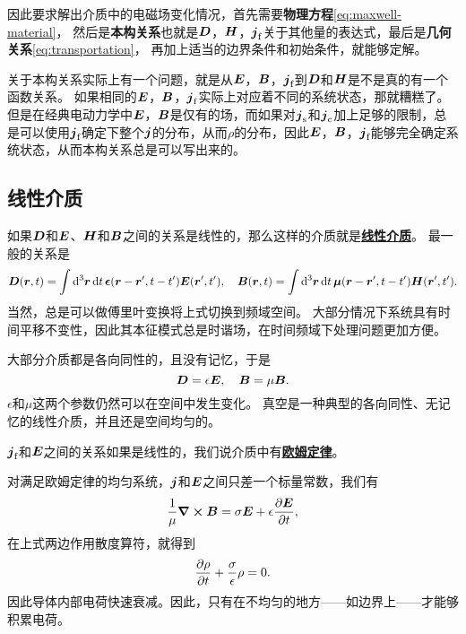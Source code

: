\documentclass[UTF8, a4paper]{ctexart}
\renewcommand{\emph}[1]{\textbf{#1}}
\newcommand*{\concept}[1]{\underline{\textbf{#1}}}
\begin{document}
因此要求解出介质中的电磁场变化情况，首先需要\emph{物理方程}\eqref{eq:maxwell-material}，
然后是\emph{本构关系}也就是$\vb*{D}$，$\vb*{H}$，$\vb*{j}_\text{f}$关于其他量的表达式，最后是\emph{几何关系}\eqref{eq:transportation}，
再加上适当的边界条件和初始条件，就能够定解。

关于本构关系实际上有一个问题，就是从$\vb*{E}$，$\vb*{B}$，$\vb*{j}_\text{f}$到$\vb*{D}$和$\vb*{H}$是不是真的有一个函数关系。
如果相同的$\vb*{E}$，$\vb*{B}$，$\vb*{j}_\text{f}$实际上对应着不同的系统状态，那就糟糕了。
但是在经典电动力学中$\vb*{E}$，$\vb*{B}$是仅有的场，而如果对$\vb*{j}_\text{s}$和$\vb*{j}_\text{c}$加上足够的限制，总是可以使用$\vb*{j}_\text{f}$确定下整个$\vb*{j}$的分布，从而$\rho$的分布，因此$\vb*{E}$，$\vb*{B}$，$\vb*{j}_\text{f}$能够完全确定系统状态，从而本构关系总是可以写出来的。

\subsection{线性介质}

如果$\vb*{D}$和$\vb*{E}$、$\vb*{H}$和$\vb*{B}$之间的关系是线性的，那么这样的介质就是\concept{线性介质}。
最一般的关系是
\begin{equation}
    \vb*{D}(\vb*{r}, t) = \int \dd[3]{\vb*{r}} \dd{t} \vb*{\epsilon}(\vb*{r} - \vb*{r}', t - t') \vb*{E}(\vb*{r}', t'), \quad
    \vb*{B}(\vb*{r}, t) = \int \dd[3]{\vb*{r}} \dd{t} \vb*{\mu}(\vb*{r} - \vb*{r}', t - t') \vb*{H}(\vb*{r}', t').
\end{equation}
当然，总是可以做傅里叶变换将上式切换到频域空间。
大部分情况下系统具有时间平移不变性，因此其本征模式总是时谐场，在时间频域下处理问题更加方便。

大部分介质都是各向同性的，且没有记忆，于是
\begin{equation}
    \vb*{D} = \epsilon \vb*{E}, \quad \vb*{B} = \mu \vb*{B}.
\end{equation}
$\epsilon$和$\mu$这两个参数仍然可以在空间中发生变化。
真空是一种典型的各向同性、无记忆的线性介质，并且还是空间均匀的。

$\vb*{j}_\text{f}$和$\vb*{E}$之间的关系如果是线性的，我们说介质中有\concept{欧姆定律}。

对满足欧姆定律的均匀系统，$\vb*{j}$和$\vb*{E}$之间只差一个标量常数，我们有
\[
    \frac{1}{\mu} \curl{\vb*{B}} = \sigma \vb*{E} + \epsilon \pdv{\vb*{E}}{t},
\]
在上式两边作用散度算符，就得到
\begin{equation}
    \pdv{\rho}{t} + \frac{\sigma}{\epsilon} \rho = 0.
\end{equation}
因此导体内部电荷快速衰减。因此，只有在不均匀的地方——如边界上——才能够积累电荷。
\end{document}
